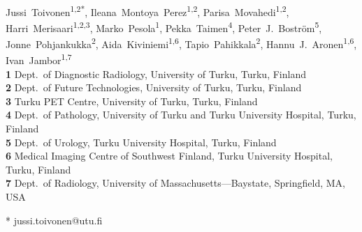 \documentclass[10pt,letterpaper]{article}
\newcommand{\turku}{Turku, Finland}
\newcommand{\utu}{University of Turku}
\newcommand{\tyks}{Turku University Hospital}
\newcommand{\deptdr}{Dept.\ of Diagnostic Radiology}
\newcommand{\deptft}{Dept.\ of Future Technologies}
\begin{document}
\vspace*{0.2in}

\begin{flushleft}
{\Large
\textbf{}
}
\newline
\\
Jussi~Toivonen\textsuperscript{1,2*},
Ileana~Montoya~Perez\textsuperscript{1,2},
Parisa~Movahedi\textsuperscript{1,2},
Harri~Merisaari\textsuperscript{1,2,3},
Marko~Pesola\textsuperscript{1},
Pekka~Taimen\textsuperscript{4},
Peter~J.~Boström\textsuperscript{5},
Jonne~Pohjankukka\textsuperscript{2},
Aida~Kiviniemi\textsuperscript{1,6},
Tapio~Pahikkala\textsuperscript{2},
Hannu~J.~Aronen\textsuperscript{1,6},
Ivan~Jambor\textsuperscript{1,7}
\\
\bigskip
\textbf{1} \deptdr, \utu, \turku\\
\textbf{2} \deptft, \utu, \turku\\
\textbf{3} Turku PET Centre, \utu, \turku\\
\textbf{4} Dept.\ of Pathology, \utu{} and \tyks, \turku\\
\textbf{5} Dept.\ of Urology, \tyks, \turku\\
\textbf{6} Medical Imaging Centre of Southwest Finland, \tyks, \turku\\
\textbf{7} Dept.\ of Radiology, University of Massachusetts---Baystate,
Springfield, MA, USA\\
\bigskip

%


* jussi.toivonen@utu.fi

\end{flushleft}
\end{document}
